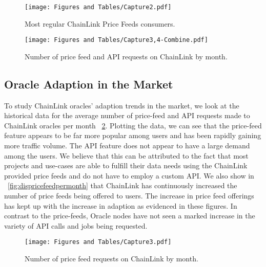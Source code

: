 \documentclass[runningheads]{llncs}
\begin{document}
\begin{figure}
\begin{center}
\texttt{[image: Figures and Tables/Capture2.pdf]}
\caption{Most regular ChainLink Price Feeds consumers.}
\label{fig:mostregcustom}
\end{center}
\end{figure}
\vspace{-5pt}
\fi

\begin{figure}
\begin{center}
\texttt{[image: Figures and Tables/Capture3,4-Combine.pdf]}
\caption{Number of price feed and API requests on ChainLink by month.}
\label{fig:Reqspermonth}
\end{center}
\end{figure}
\vspace{-5pt}


\subsection{Oracle Adaption in the Market}
To study ChainLink oracles' adaption trends in the market, we look at the historical data for the average number of price-feed and API requests made to ChainLink oracles per month \figurename~\ref{fig:Reqspermonth}. Plotting the data, we can see that the price-feed feature appears to be far more popular among users and has been rapidly gaining more traffic volume. The API feature does not appear to have a large demand among the users. We believe that this can be attributed to the fact that most projects and use-cases are able to fulfill their data needs using the ChainLink provided price feeds and do not have to employ a custom API.
We also show in \figurename~\ref{fig:dispricefeedpermonth} that ChainLink has continuously increased the number of price feeds being offered to users. The increase in price feed offerings has kept up with the increase in adaption as evidenced in these figures. In contrast to the price-feeds, Oracle nodes have not seen a marked increase in the variety of API calls and jobs being requested.

\iffalse
\begin{figure}
\begin{center}
\texttt{[image: Figures and Tables/Capture3.pdf]}
\caption{Number of price feed requests on ChainLink by month.}
\label{fig:pricefeedpermonth}
\end{center}
\end{figure}
\vspace{-5pt}
\end{document}
